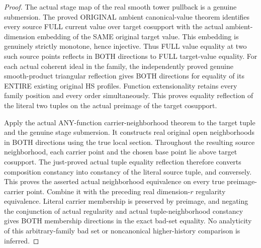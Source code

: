\begin{proof}
The actual stage map of the real smooth tower pullback is a genuine
submersion. The proved ORIGINAL ambient canonical-value theorem identifies
every source FULL current value over target cosupport with the actual
ambient-dimension embedding of the SAME original target value. This
embedding is genuinely strictly monotone, hence injective. Thus FULL
value equality at two such source points reflects in BOTH directions to
FULL target-value equality. For each actual coherent ideal in the family,
the independently proved genuine smooth-product triangular reflection
gives BOTH directions for equality of its ENTIRE existing original HS
profiles. Function extensionality retains every family position and
every order simultaneously. This proves equality reflection of the
literal two tuples on the actual preimage of the target cosupport.

Apply the actual ANY-function carrier-neighborhood theorem to the target
tuple and the genuine stage submersion. It constructs real original open
neighborhoods in BOTH directions using the true local section. Throughout
the resulting source neighborhood, each carrier point and the chosen base
point lie above target cosupport. The just-proved actual tuple equality
reflection therefore converts composition constancy into constancy of
the literal source tuple, and conversely. This proves the asserted actual
neighborhood equivalence on every true preimage-carrier point. Combine
it with the preceding real dimension-$r$ regularity equivalence. Literal
carrier membership is preserved by preimage, and negating the conjunction
of actual regularity and actual tuple-neighborhood constancy gives BOTH
membership directions in the exact bad-set equality. No analyticity of
this arbitrary-family bad set or noncanonical higher-history comparison
is inferred.
\end{proof}


